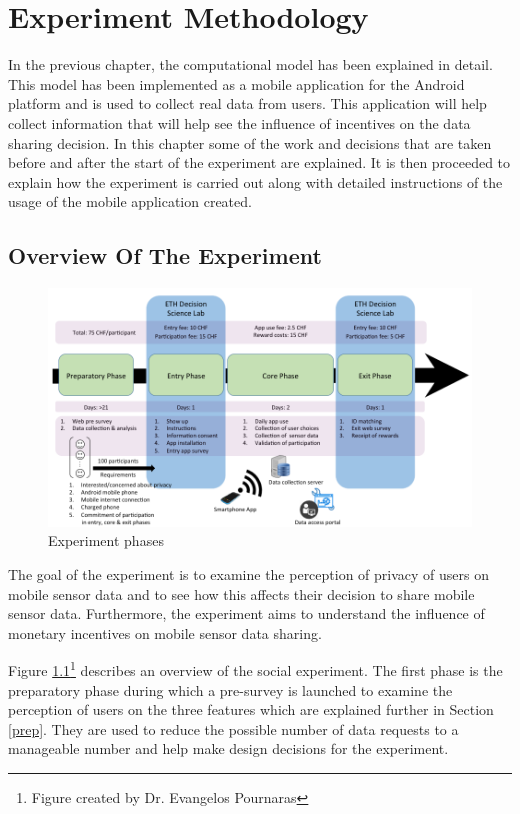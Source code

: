 \chapter{Experiment Methodology} \label{exp}

In the previous chapter, the computational model has been explained in detail. This model has been implemented as a mobile application for the Android platform and is used to collect real data from users. This application will help collect information that will help see the influence of incentives on the data sharing decision. In this chapter some of the work and decisions that are taken before and after the start of the experiment are explained. It is then proceeded to explain how the experiment is carried out along with detailed instructions of the usage of the mobile application created. 

\section{Overview Of The Experiment} \label{overview}
\begin{figure}[ht!]
\centering
\includegraphics[width=\textwidth,keepaspectratio]{./images/exp_phases}
\caption{Experiment phases}
\label{fig:exp_phases}
\end{figure}

The goal of the experiment is to examine the perception of privacy of users on mobile sensor data and to see how this affects their decision to share mobile sensor data. Furthermore, the experiment aims to understand the influence of monetary incentives on mobile sensor data sharing.

Figure \ref{fig:exp_phases}\footnote{Figure created by Dr. Evangelos Pournaras} describes an overview of the social experiment. The first phase is the preparatory phase during which a pre-survey is launched to examine the perception of users on the three features which are explained further in Section \ref{prep}. They are used to reduce the possible number of data requests to a manageable number and help make design decisions for the experiment.

